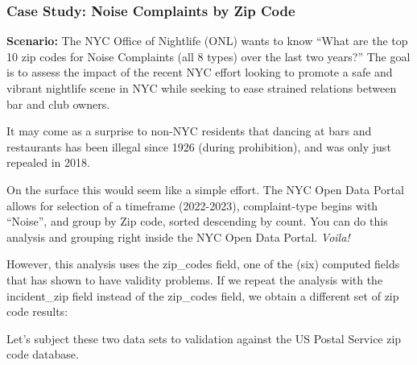 \documentclass[12pt, titlepage]{article}
\begin{document}
\subsubsection{Case Study: Noise Complaints by Zip Code}
\label{sec:case-study-zip-codes}
		\textbf{Scenario:} The NYC Office of Nightlife (ONL) wants to 
		know ``What are the top 10 zip codes for Noise Complaints (all 8 types) 
		over the last two years?'' The goal is to assess the impact of the 
		recent NYC effort looking to promote a safe and vibrant 
		nightlife scene in NYC while seeking to ease strained 
		relations between bar and club owners. 
		
		It may come as a surprise to non-NYC residents that dancing at 
		bars and restaurants has been illegal since 1926 (during prohibition), 
		and was only just repealed in 2018. 
		
		On the surface this would seem like a simple effort.  The NYC Open 
		Data Portal allows for selection of a timeframe (2022-2023), 
		complaint-type begins with ``Noise'', and group by Zip code, 
		sorted descending by count. You can do this analysis and 
		grouping right inside the NYC Open Data Portal. \textit{Voila!}

		However, this analysis uses the zip\_codes field, one of the (six) 
		computed fields that has shown to have validity problems. 
		If we repeat the analysis with the incident\_zip field instead 
		of the zip\_codes field, we obtain a different set of zip code results:
		
		Let's subject these two data sets to validation against 
		the US Postal Service zip code database.
	 
\end{document}
